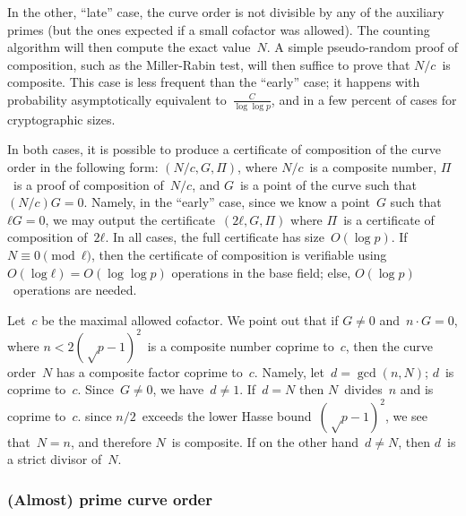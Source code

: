 \documentclass[twocolumn,letterpaper,10pt]{article}
\begin{document}
\smallskip

In the other, “late” case, the curve order is not divisible
by any of the auxiliary primes (but the ones expected if
a small cofactor was allowed).
The counting algorithm will then compute the exact value~$N$.
A simple pseudo-random proof of composition,
such as the Miller-Rabin test,
will then suffice to prove that $N/c$~is composite.
This case is less frequent than the “early” case;
it happens with probability
asymptotically equivalent to~$\frac{C}{\log \log p}$,
and in a few percent of cases for cryptographic sizes.

\smallskip

In both cases, it is possible to produce a certificate of composition
of the curve order in the following form: $(N/c, G, Π)$,
where $N/c$~is a composite number,%
$Π$~is a proof of composition of~$N/c$,
and $G$~is a point of the curve such that~$(N/c) G = 0$.
Namely, in the “early” case, since we know a point~$G$ such that~$ℓ G = 0$,
we may output the certificate~$(2 ℓ, G, Π)$
where $Π$~is a certificate of composition of~$2 ℓ$.
In all cases, the full certificate has size~$O(\log p)$.
If $N ≡ 0 \pmod{ℓ}$, then the certificate of composition
is verifiable using~$O(\log ℓ) = O(\log \log p)$ operations in the base field;
else, $O(\log p)$~operations are needed.

Let~$c$ be the maximal allowed cofactor.
We point out that if $G ≠ 0$ and~$n · G = 0$, where
$n < 2(√p-1)^2$~is a composite number coprime to~$c$,
then the curve order~$N$ has a composite factor coprime to~$c$.
Namely, let~$d = \gcd (n, N)$; $d$~is coprime to~$c$.
Since~$G≠0$, we have~$d≠1$.
If~$d = N$ then $N$~divides~$n$ and is coprime to~$c$.
since $n/2$~exceeds the lower Hasse bound~$(√p-1)^2$,
we see that~$N = n$, and therefore $N$~is composite.
If on the other hand~$d ≠ N$, then $d$~is a strict divisor of~$N$.


\subsubsection{(Almost) prime curve order}
\end{document}
